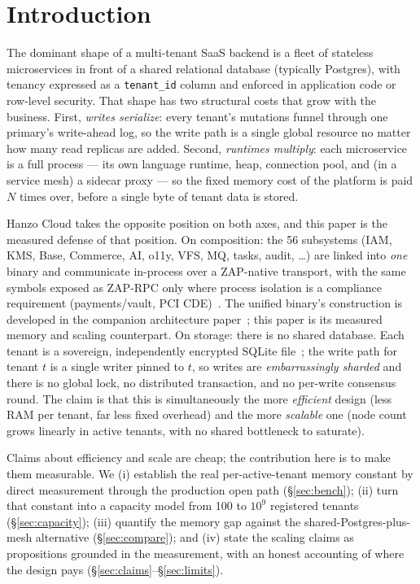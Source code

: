 \documentclass[11pt]{article}
\begin{document}
\section{Introduction}
\label{sec:intro}
The dominant shape of a multi-tenant SaaS backend is a fleet of stateless microservices in
front of a shared relational database (typically Postgres), with tenancy expressed as a
\texttt{tenant\_id} column and enforced in application code or row-level security. That shape
has two structural costs that grow with the business. First, \emph{writes serialize}: every
tenant's mutations funnel through one primary's write-ahead log, so the write path is a single
global resource no matter how many read replicas are added. Second, \emph{runtimes multiply}:
each microservice is a full process --- its own language runtime, heap, connection pool, and
(in a service mesh) a sidecar proxy --- so the fixed memory cost of the platform is paid $N$
times over, before a single byte of tenant data is stored.

Hanzo Cloud takes the opposite position on both axes, and this paper is the measured defense of
that position. On composition: the 56 subsystems (IAM, KMS, Base, Commerce, AI, o11y, VFS, MQ,
tasks, audit, \dots) are linked into \emph{one} binary and communicate in-process over a
ZAP-native transport, with the same symbols exposed as ZAP-RPC only where process isolation is
a compliance requirement (payments/vault, PCI CDE)~\cite{hip0106,hip0116,hip0125}. The unified
binary's construction is developed in the companion architecture paper~\cite{unifiedbin}; this
paper is its measured memory and scaling counterpart. On storage: there is
no shared database. Each tenant is a sovereign, independently encrypted SQLite
file~\cite{hip0302}; the write path for tenant $t$ is a single writer pinned to $t$, so writes
are \emph{embarrassingly sharded} and there is no global lock, no distributed transaction, and
no per-write consensus round. The claim is that this is simultaneously the more \emph{efficient}
design (less RAM per tenant, far less fixed overhead) and the more \emph{scalable} one (node
count grows linearly in active tenants, with no shared bottleneck to saturate).

Claims about efficiency and scale are cheap; the contribution here is to make them measurable.
We (i) establish the real per-active-tenant memory constant by direct measurement through the
production open path (\S\ref{sec:bench}); (ii) turn that constant into a capacity model from
100 to $10^9$ registered tenants (\S\ref{sec:capacity}); (iii) quantify the memory gap against
the shared-Postgres-plus-mesh alternative (\S\ref{sec:compare}); and (iv) state the scaling
claims as propositions grounded in the measurement, with an honest accounting of where the
design pays (\S\ref{sec:claims}--\S\ref{sec:limits}).
\end{document}
